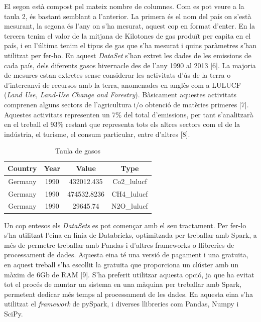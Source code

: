 \documentclass[10pt,a4paper,twocolumn,twoside]{article}
\begin{document}
El segon està compost pel mateix nombre de columnes. Com es pot veure a la taula 2, és bastant semblant a l'anterior. La primera és el nom del país on s'està mesurant, la segona és l'any on s'ha mesurat, aquest cop en format d'enter. En la tercera tenim el valor de la mitjana de Kilotones de gas produït per capita en el país, i en l'última tenim el tipus de gas que s'ha mesurat i quins paràmetres s'han utilitzat per fer-ho. En aquest \textit{DataSet} s'han extret les dades de les emissions de cada país, dels diferents gasos hivernacle des de l'any 1990 al 2013 [6]. La majoria de mesures estan extretes sense considerar les activitats d'ús de la terra o d'intercanvi de recursos amb la terra, anomenades en anglès com a LULUCF (\textit{Land Use, Land-Use Change and Forestry}). Bàsicament aquestes activitats comprenen alguns sectors de l'agricultura i/o obtenció de matèries primeres [7]. Aquestes activitats representen un 7\% del total d'emissions, per tant s'analitzarà en el treball el 93\% restant que representa tots els altres sectors com el de la indústria, el turisme, el consum particular, entre d'altres [8].
\begin{table}[th]
\caption{Taula de gasos}
\begin{center}
\begin{tabular}{c c c c} %
\hline\hline %
Country & Year & Value & Type \\
\hline
Germany & 1990 & 432012.435 & Co2\_lulucf \\
Germany & 1990 & 474532.8236 & CH4\_lulucf \\
Germany & 1990 & 29645.74 & N2O\_lulucf \\
\hline
\end{tabular}
\end{center}
\end{table}

Un cop entesos els \textit{DataSets} es pot començar amb el seu tractament. Per fer-lo s'ha utilitzat l'eina en línia de Databricks, optimitzada per treballar amb Spark, a més de permetre treballar amb Pandas i d'altres frameworks o llibreries de processament de dades. Aquesta eina té una versió de pagament i una gratuïta, en aquest treball s'ha escollit la gratuïta que proporciona un clúster amb un màxim de 6Gb de RAM [9]. S'ha preferit utilitzar aquesta opció, ja que ha evitat tot el procés de muntar un sistema en una màquina per treballar amb Spark, permetent dedicar més temps al processament de les dades. En aquesta eina s'ha utilitzat el \textit{framework} de pySpark, i diverses llibreries com Pandas, Numpy i SciPy.
\end{document}
